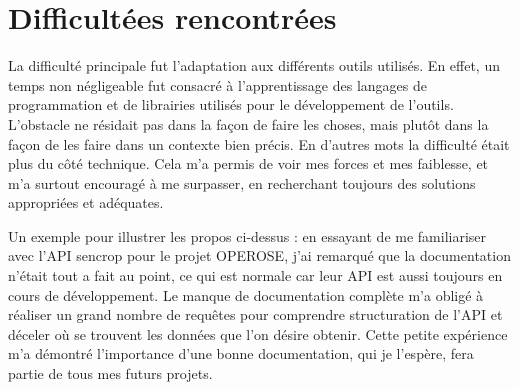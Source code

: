 \section{Difficultées rencontrées}
La difficulté principale fut l'adaptation aux différents outils utilisés. En effet, un temps non négligeable fut consacré à l'apprentissage des langages de programmation et de librairies utilisés pour le développement de l'outils. L'obstacle ne résidait pas dans la façon de faire les choses, mais plutôt dans la façon de les faire dans un contexte bien précis. En d'autres mots la difficulté était plus du côté technique. Cela m'a permis de voir mes forces et mes faiblesse, et m'a surtout encouragé à me surpasser, en recherchant toujours des solutions appropriées et adéquates. 

Un exemple pour illustrer les propos ci-dessus : en essayant de me familiariser avec l'API sencrop pour le projet OPEROSE, j'ai remarqué que la documentation n'était tout a fait au point, ce qui est normale car leur API est aussi toujours en cours de développement. Le manque de documentation complète m'a obligé à réaliser un grand nombre de requêtes  pour comprendre  structuration de l'API et déceler où se trouvent les données que l'on désire obtenir. Cette petite expérience m'a démontré l'importance d'une bonne documentation, qui je l'espère, fera partie de tous mes futurs projets.
